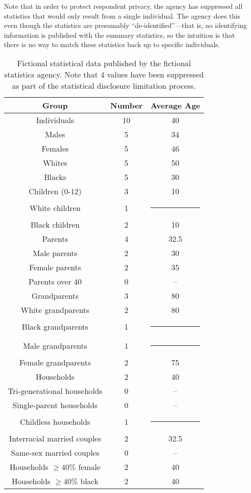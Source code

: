 \documentclass[runningheads]{llncs}
\begin{document}
Note that in order to protect respondent privacy, the agency has
suppressed all statistics that would only result from a single
individual. The agency does this even though the statistics are
presumably ``de-identified''---that is, no identifying information is
published with the summary statistics, so the intuition is that there
is no way to match these statistics back up to specific individuals.

\begin{table}
\begin{center}
\begin{tabular}{c|c|c}
Group & Number & Average Age \\
\hline
Individuals & 10 & 40 \\
Males & 5 & 34 \\
Females & 5 & 46 \\
Whites & 5 & 50 \\
Blacks & 5 & 30 \\
\hline
Children (0-12) & 3 & 10 \\
White children & 1 & \multicolumn{1}{c}{\rule{6mm}{3mm}} \\
Black children & 2 & 10 \\
\hline
Parents & 4 & 32.5 \\
Male parents & 2 & 30 \\
Female parents & 2 & 35 \\
Parents over 40 & 0 & -- \\
\hline
Grandparents & 3 & 80 \\
White grandparents & 2 & 80 \\
Black grandparents & 1 & \multicolumn{1}{c}{\rule{6mm}{3mm}} \\
Male grandparents & 1 & \multicolumn{1}{c}{\rule{6mm}{3mm}} \\
Female grandparents & 2 & 75 \\
\hline
Households & 2 & 40 \\
Tri-generational households & 0 & -- \\
Single-parent households & 0 & -- \\
Childless households & 1 & \multicolumn{1}{c}{\rule{6mm}{3mm}} \\
Interracial married couples & 2 & 32.5 \\
Same-sex married couples & 0 & -- \\
Households $\geq 40\% $ female & 2 & 40 \\
Households $\geq 40\% $ black & 2 & 40 \\
\hline
\end{tabular}
\end{center}
\caption{Fictional statistical data published by the fictional
  statistics agency. Note that 4 values have been suppressed as part
  of the statistical disclosure limitation process.}\label{publishedstatsbig}
\end{table}
\end{document}
